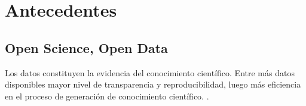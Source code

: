 \documentclass[
10pt, %
letterpaper, %
oneside, %
headinclude,footinclude, %
BCOR5mm, %
]{scrartcl}
\title{\normalfont\spacedallcaps{Banco de Datos INMEGEN}}
\author{\spacedlowsmallcaps{Rodrigo García Herrera}}
\date{} %
\begin{document}

\renewcommand{\sectionmark}[1]{\markright{\spacedlowsmallcaps{#1}}} %
\lehead{\mbox{\llap{\small\thepage\kern1em\color{halfgray} \vline}\color{halfgray}\hspace{0.5em}\rightmark\hfil}} %

\pagestyle{scrheadings} %



\maketitle %
\setcounter{tocdepth}{2} %
\tableofcontents %




\section{Antecedentes}


\subsection{Open Science, Open Data}

Los datos constituyen la evidencia del conocimiento científico. Entre
más datos disponibles mayor nivel de transparencia y reproducibilidad,
luego más eficiencia en el proceso de generación de conocimiento
científico. \cite{molloy_open_2011}.


\cite{walport_sharing_2011}
\cite{piwowar_sharing_2007}
\cite{alsheikh-ali_public_2011}
\cite{wicherts_poor_2006}
\cite{wicherts_publish_2012}
\cite{wicherts_willingness_2011}
\end{document}
